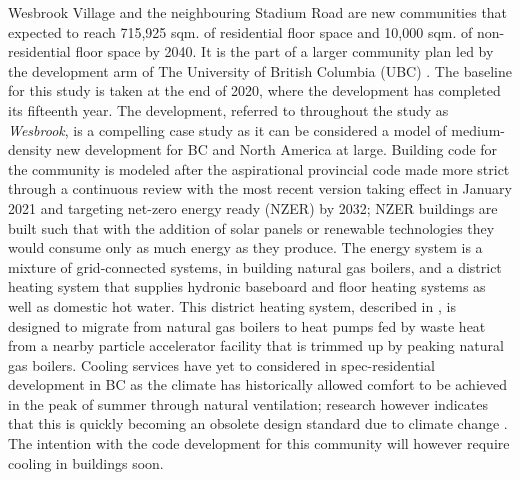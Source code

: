 \documentclass[twocolumn, a4paper,10pt]{article}
\begin{document}
Wesbrook Village and the neighbouring Stadium Road are new communities that expected to reach 715,925 sqm. of residential floor space and 10,000 sqm. of non-residential floor space by 2040. It is the part of a larger community plan led by the development arm of The University of British Columbia (UBC) \citep{ubc_planning_ubc_2020,ubc_planning_ubc_2020_SR}. The baseline for this study is taken at the end of 2020, where the development has completed its fifteenth year. The development, referred to throughout the study as \textit{Wesbrook}, is a compelling case study as it can be considered a model of medium-density new development for BC and North America at large. Building code for the community is modeled after the aspirational provincial code made more strict through a continuous review with the most recent version taking effect in January 2021 and targeting net-zero energy ready (NZER) by 2032; NZER buildings are built such that with the addition of solar panels or renewable technologies they would consume only as much energy as they produce. The energy system is a mixture of grid-connected systems, in building natural gas boilers, and a district heating system that supplies hydronic baseboard and floor heating systems as well as domestic hot water. This district heating system, described in \citet{mccarty_accepted_2020}, is designed to migrate from natural gas boilers to heat pumps fed by waste heat from a nearby particle accelerator facility that is trimmed up by peaking natural gas boilers. Cooling services have yet to considered in spec-residential development in BC as the climate has historically allowed comfort to be achieved in the peak of summer through natural ventilation; research however indicates that this is quickly becoming an obsolete design standard due to climate change \citep{rysanek_forecasting_2021}. The intention with the code development for this community will however require cooling in buildings soon.  
\end{document}
